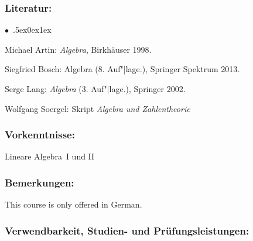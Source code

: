 \documentclass[a4paper,10pt]{article}
\renewenvironment{itemize}{\begin{list}{$\bullet$\ }{\itemsep.5ex\setlength{\topsep}{0.5\itemsep}\parsep0ex\labelsep1ex\settowidth{\labelwidth}{$\bullet$\ }\setlength{\leftmargin}{\labelwidth}\addtolength{\leftmargin}{3ex}\addtolength{\leftmargin}{\labelsep}}}{\end{list}}
\begin{document}
\subsubsection*{\large
    Literatur:
}
\begin{itemize}
\item Michael Artin: \emph{Algebra}, Birkhäuser 1998.
\item Siegfried Bosch: Algebra (8. Auf"|lage.), Springer Spektrum 2013.
\item Serge Lang: \emph{Algebra} (3. Auf"|lage.), Springer 2002.
\item Wolfgang Soergel: Skript \emph{Algebra und Zahlentheorie}
\end{itemize}
\subsubsection*{\large
    Vorkenntnisse:
}
Lineare Algebra~I und II
\subsubsection*{\large
    Bemerkungen:
}
This course is only offered in German.
\subsubsection*{\large
    Verwendbarkeit, Studien- und Prüfungsleistungen:
}
\end{document}

